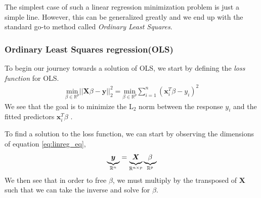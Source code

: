 \documentclass[11pt]{article}
\begin{document}
The simplest case of such a linear regression minimization problem is just a simple line\citep[ch. 3.1, p. 61]{james2013introduction}. However, this can be generalized greatly and we end up with the standard go-to method called \textit{Ordinary Least Squares}.

\subsubsection{Ordinary Least Squares regression(OLS)}
To begin our journey towards a solution of OLS, we start by defining the \textit{loss function} for OLS. 
\begin{align}
    \underset{\beta\in \mathbb{R}^{p}}{\text{min}}||\bm{X}\beta - \bm{y}||^2_2 = 
    \underset{\beta\in \mathbb{R}^{p}}{\text{min}}\sum^n_{i=1}\left(\bm{x}^T_i\beta - y_i\right)^2
\end{align}
We see that the goal is to minimize the L$_2$ norm between the response $y_i$ and the fitted predictors $\bm{x}_i^T\beta$ \citep[ch. 4, p. 21]{2018arXiv180308823M}.

To find a solution to the loss function, we can start by observing the dimensions of equation \eqref{eq:linreg_eq},
\begin{align}
    \underbrace{\vphantom{\beta}\bm{y}}_{\mathbb{R}^{n}} = \underbrace{\vphantom{\beta}\bm{X}}_{\mathbb{R}^{n\times p}} \underbrace{\beta}_{\mathbb{R}^{p}}
    \label{eq:matrix_eq_solution}
\end{align}
We then see that in order to free $\beta$, we must multiply by the transposed of $\bm{X}$ such that we can take the inverse and solve for $\beta$.
\end{document}
